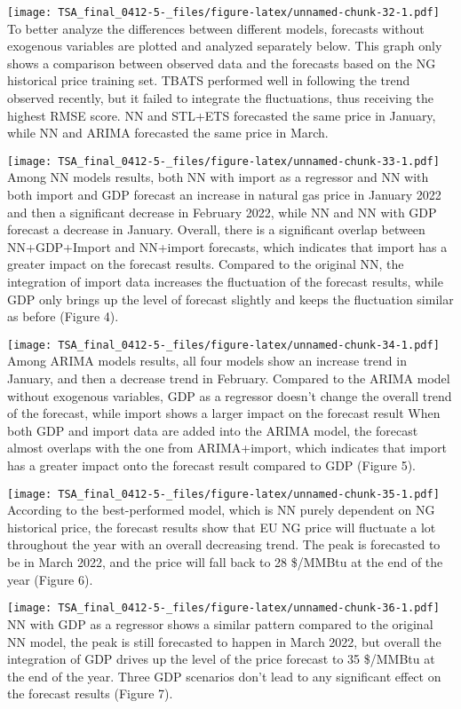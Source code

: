 \documentclass[
]{article}
\begin{document}
\texttt{[image: TSA\_final\_0412-5-\_files/figure-latex/unnamed-chunk-32-1.pdf]}
To better analyze the differences between different models, forecasts
without exogenous variables are plotted and analyzed separately below.
This graph only shows a comparison between observed data and the
forecasts based on the NG historical price training set. TBATS performed
well in following the trend observed recently, but it failed to
integrate the fluctuations, thus receiving the highest RMSE score. NN
and STL+ETS forecasted the same price in January, while NN and ARIMA
forecasted the same price in March.

\texttt{[image: TSA\_final\_0412-5-\_files/figure-latex/unnamed-chunk-33-1.pdf]}
Among NN models results, both NN with import as a regressor and NN with
both import and GDP forecast an increase in natural gas price in January
2022 and then a significant decrease in February 2022, while NN and NN
with GDP forecast a decrease in January. Overall, there is a significant
overlap between NN+GDP+Import and NN+import forecasts, which indicates
that import has a greater impact on the forecast results. Compared to
the original NN, the integration of import data increases the
fluctuation of the forecast results, while GDP only brings up the level
of forecast slightly and keeps the fluctuation similar as before (Figure
4).

\texttt{[image: TSA\_final\_0412-5-\_files/figure-latex/unnamed-chunk-34-1.pdf]}
Among ARIMA models results, all four models show an increase trend in
January, and then a decrease trend in February. Compared to the ARIMA
model without exogenous variables, GDP as a regressor doesn't change the
overall trend of the forecast, while import shows a larger impact on the
forecast result When both GDP and import data are added into the ARIMA
model, the forecast almost overlaps with the one from ARIMA+import,
which indicates that import has a greater impact onto the forecast
result compared to GDP (Figure 5).

\texttt{[image: TSA\_final\_0412-5-\_files/figure-latex/unnamed-chunk-35-1.pdf]}
According to the best-performed model, which is NN purely dependent on
NG historical price, the forecast results show that EU NG price will
fluctuate a lot throughout the year with an overall decreasing trend.
The peak is forecasted to be in March 2022, and the price will fall back
to 28 \$/MMBtu at the end of the year (Figure 6).

\texttt{[image: TSA\_final\_0412-5-\_files/figure-latex/unnamed-chunk-36-1.pdf]}
NN with GDP as a regressor shows a similar pattern compared to the
original NN model, the peak is still forecasted to happen in March 2022,
but overall the integration of GDP drives up the level of the price
forecast to 35 \$/MMBtu at the end of the year. Three GDP scenarios
don't lead to any significant effect on the forecast results (Figure 7).
\end{document}
